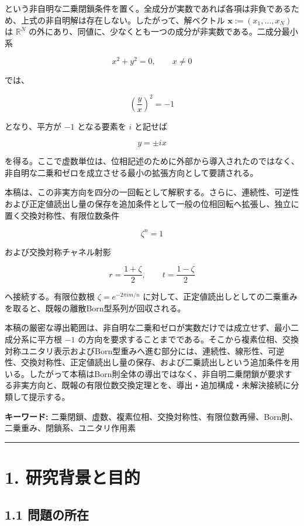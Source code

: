 \documentclass[
  a4paper,
  10pt]{article}
\begin{document}
という非自明な二乗閉鎖条件を置く。全成分が実数であれば各項は非負であるため、上式の非自明解は存在しない。したがって、解ベクトル
\(\mathbf{x}:=(x_1,\ldots,x_N)\) は \(\mathbb R^N\)
の外にあり、同値に、少なくとも一つの成分が非実数である。二成分最小系

\[
x^2+y^2=0,
\qquad x\neq0
\]

では、

\[
\left(\frac{y}{x}\right)^2=-1
\]

となり、平方が \(-1\) となる要素を \(i\) と記せば

\[
y=\pm ix
\]

を得る。ここで虚数単位は、位相記述のために外部から導入されたのではなく、非自明な二乗和ゼロを成立させる最小の拡張方向として要請される。

本稿は、この非実方向を四分の一回転として解釈する。さらに、連続性、可逆性および正定値読出し量の保存を追加条件として一般の位相回転へ拡張し、独立に置く交換対称性、有限位数条件

\[
\zeta^n=1
\]

および交換対称チャネル射影

\[
r=\frac{1+\zeta}{2},
\qquad
t=\frac{1-\zeta}{2}
\]

へ接続する。有限位数根 \(\zeta=e^{-2\pi im/n}\)
に対して、正定値読出しとしての二乗重みを取ると、既報の離散Born型系列が回収される。

本稿の厳密な導出範囲は、非自明な二乗和ゼロが実数だけでは成立せず、最小二成分系に平方根
\(-1\)
の方向を要求することまでである。そこから複素位相、交換対称ユニタリ表示およびBorn型重みへ進む部分には、連続性、線形性、可逆性、交換対称性、正定値読出し量の保存、および二乗読出しという追加条件を用いる。したがって本稿はBorn則全体の導出ではなく、非自明二乗閉鎖が要求する非実方向と、既報の有限位数交換定理とを、導出・追加構成・未解決接続に分類して提示する。

\textbf{キーワード:}
二乗閉鎖、虚数、複素位相、交換対称性、有限位数再帰、Born則、二乗重み、閉鎖系、ユニタリ作用素

\begin{center}\rule{0.5\linewidth}{0.5pt}\end{center}

\section{1.
研究背景と目的}\label{1-ux7814ux7a76ux80ccux666fux3068ux76eeux7684}

\subsection{1.1 問題の所在}\label{11-ux554fux984cux306eux6240ux5728}
\end{document}
